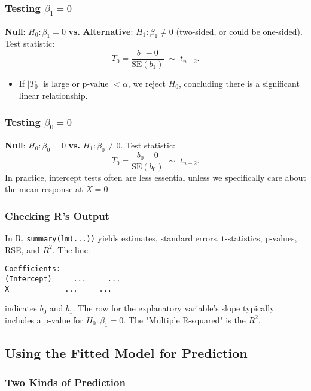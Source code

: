 \documentclass[10pt]{extarticle}
\begin{document}
\subsubsection{Testing $\beta_1 = 0$}

\textbf{Null}: $H_0: \beta_1 = 0$ \quad \textbf{vs.} \quad \textbf{Alternative}: $H_1: \beta_1\neq0$ (two-sided, or could be one-sided).
Test statistic:
\[
    T_0 = \frac{b_1 - 0}{\text{SE}(b_1)} \;\sim\; t_{n-2}.
\]
\begin{itemize}
    \item If $\lvert T_0\rvert$ is large or p-value $< \alpha$, we reject $H_0$, concluding there is a significant linear relationship.
\end{itemize}

\subsubsection{Testing $\beta_0 = 0$}

\textbf{Null}: $H_0: \beta_0=0$ \quad \textbf{vs.} \quad $H_1: \beta_0\neq0$.
Test statistic:
\[
    T_0 = \frac{b_0 - 0}{\text{SE}(b_0)} \;\sim\; t_{n-2}.
\]
In practice, intercept tests often are less essential unless we specifically care about the mean response at $X=0$.

\subsubsection{Checking R's Output}

In R, \texttt{summary(lm(...))} yields estimates, standard errors, t-statistics, p-values, RSE, and $R^2$. The line:

\begin{verbatim}
Coefficients:
(Intercept)     ...     ...
X             ...     ...
\end{verbatim}

indicates $b_0$ and $b_1$. The row for the explanatory variable's slope typically includes a p-value for $H_0: \beta_1=0$. The "Multiple R-squared" is the $R^2$.



\subsection{Using the Fitted Model for Prediction}

\subsubsection{Two Kinds of Prediction}
\end{document}
